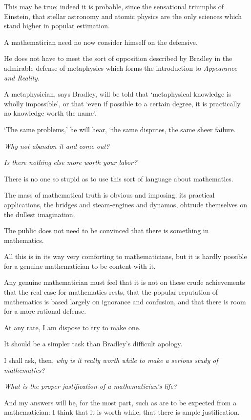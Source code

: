 \documentclass{article}
\numberwithin{equation}{section}
\begin{document}
This may be true; indeed it is probable, since the sensational triumphs of Einstein, that stellar astronomy and atomic physics are the only sciences which stand higher in popular estimation.

A mathematician need no now consider himself on the defensive.

He does not have to meet the sort of opposition described by Bradley in the admirable defense of metaphysics which forms the introduction to \textit{Appearance and Reality}.

%
A metaphysician, says Bradley, will be told that `metaphysical knowledge is wholly impossible', or that `even if possible to a certain degree, it is practically no knowledge worth the name'.

`The same problems,' he will hear, `the same disputes, the same sheer failure.

\textit{Why not abandon it and come out?}

\textit{Is there nothing else more worth your labor?}'

There is no one so stupid as to use this sort of language about mathematics.

The mass of mathematical truth is obvious and imposing; its practical applications, the bridges and steam-engines and dynamos, obtrude themselves on the dullest imagination.

The public does not need to be convinced that there is something in mathematics.

%
All this is in its way very comforting to mathematicians, but it is hardly possible for a genuine mathematician to be content with it.

Any genuine mathematician must feel that it is not on these crude achievements that the real case for mathematics rests, that the popular reputation of mathematics is based largely on ignorance and confusion, and that there is room for a more rational defense.

At any rate, I am dispose to try to make one.

It should be a simpler task than Bradley's difficult apology.

%
I shall ask, then, \textit{why is it really worth while to make a serious study of mathematics?}

\textit{What is the proper justification of a mathematician's life?}

And my answers will be, for the most part, such as are to be expected from a mathematician: I think that it is worth while, that there is ample justification.
\end{document}
